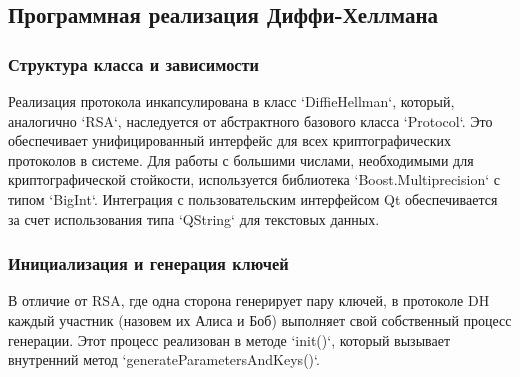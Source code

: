 \subsection{Программная реализация Диффи-Хеллмана}

\subsubsection{Структура класса и зависимости}
Реализация протокола инкапсулирована в класс `DiffieHellman`, который, аналогично `RSA`, наследуется от абстрактного базового класса `Protocol`. Это обеспечивает унифицированный интерфейс для всех криптографических протоколов в системе. Для работы с большими числами, необходимыми для криптографической стойкости, используется библиотека `Boost.Multiprecision` с типом `BigInt`. Интеграция с пользовательским интерфейсом Qt обеспечивается за счет использования типа `QString` для текстовых данных.



\subsubsection{Инициализация и генерация ключей}
В отличие от RSA, где одна сторона генерирует пару ключей, в протоколе DH каждый участник (назовем их Алиса и Боб) выполняет свой собственный процесс генерации. Этот процесс реализован в методе `init()`, который вызывает внутренний метод `generateParametersAndKeys()`.

